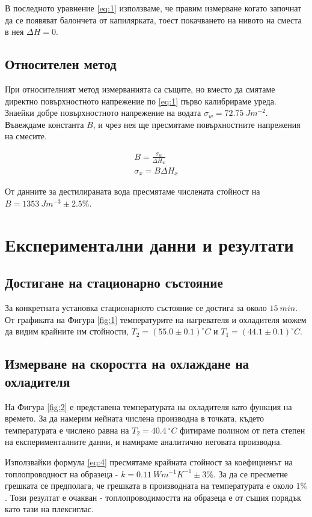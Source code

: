 \documentclass[reprint,amsmath,amssymb,aps,floatfix]{revtex4-2}
\newcommand{\degree}{^{\circ}}
\begin{document}
В последното уравнение \eqref{eq:1} използваме, че правим измерване когато започнат да се появяват балончета от капилярката, тоест покачването на нивото на сместа в нея $\Delta H = 0$.

\subsection{Относителен метод}

При относителният метод измерванията са същите, но вместо да смятаме директно повърхностното напрежение по \eqref{eq:1} първо калибрираме уреда. Знаейки добре повърхностното напрежение на водата $\sigma_w = 72.75 \ \si{J m^{-2}}$. Въвеждаме константа $B$, и чрез нея ще пресмятаме повърхностните напрежения на смесите. 

\begin{gather*}
    B = \frac{\sigma_w}{\Delta H_w} \\
    \sigma_x = B \Delta H_x 
\end{gather*}

От данните за дестилираната вода пресмятаме числената стойност на $B = 1353 \ \si{Jm^{-3}} \pm 2.5\% $. 

\section{Експериментални данни и резултати}
\subsection{Достигане на стационарно състояние}

За конкретната установка стационарното състояние се достига за около $15 \ \si{min}$. От графиката на Фигура \ref{fig:1} температурите на нагревателя и охладителя можем да видим крайните им стойности, $T_2 = (55.0 \pm 0.1) \degree C$ и $T_1 = (44.1 \pm 0.1) \degree C$. 

\subsection{Измерване на скоростта на охлаждане на охладителя}

На Фигура \ref{fig:2} е представена температурата на охладителя като функция на времето. За да намерим нейната числена производна в точката, където температурата е числено равна на $T_2 = 40.4 \ \degree C$ фитираме полином от пета степен на експерименталните данни, и намираме аналитично неговата производна.  


Използвайки формула \eqref{eq:4} пресмятаме крайната стойност за коефициенът на топлопроводност на образеца - $k = 0.11 \ \si{Wm^{-1}K^{-1}} \pm 3\%$.  За да се пресметне грешката се предполага, че грешката в производната на температурата е около $1\%$. Този резултат е очакван - топлопроводимостта на образеца е от същия порядък като тази на плексиглас. 
\end{document}
